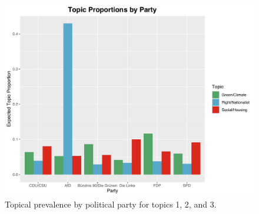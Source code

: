 \begin{figure}[h!]
  \centering
  \captionsetup{justification=centering,margin=2cm}
  \includegraphics[scale = 0.5]{../plots/appendix/5_1/beta_t134_cat.pdf}
  \caption{Topical prevalence by political party for topics 1, 2, and 3.}
  \label{fig:boat1}
\end{figure}

